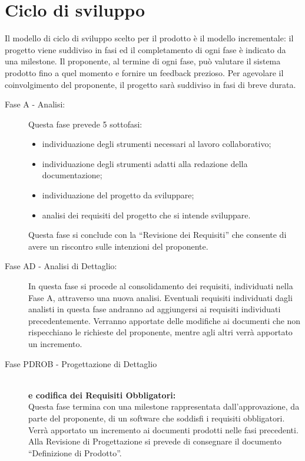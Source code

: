 \documentclass[../PianoProgetto.tex]{subfiles}
\begin{document}
\section{Ciclo di sviluppo}

	Il modello di ciclo di sviluppo scelto per il prodotto è il modello incrementale: il progetto viene suddiviso in fasi ed il completamento di ogni fase è indicato da una milestone.
	Il proponente, al termine di ogni fase, può valutare il sistema prodotto fino a quel momento e fornire un feedback prezioso.
	Per agevolare il coinvolgimento del proponente, il progetto sarà suddiviso in fasi di breve durata.
	\begin{description}
	
	\item[Fase A - Analisi:] Questa fase prevede 5 sottofasi:
		\begin{itemize}
		\item individuazione degli strumenti necessari al lavoro collaborativo;
		\item individuazione degli strumenti adatti alla redazione della documentazione;
		\item individuazione del progetto da sviluppare;
		\item analisi dei requisiti del progetto che si intende sviluppare.
		\end{itemize}
		Questa fase si conclude con la “Revisione dei Requisiti” che consente di avere un riscontro sulle intenzioni del proponente.


	\item[Fase AD - Analisi di Dettaglio:] In questa fase si procede al consolidamento dei requisiti, individuati nella Fase A, attraverso una nuova analisi.
		Eventuali requisiti individuati dagli analisti in questa fase andranno ad aggiungersi ai requisiti individuati precedentemente. 
		Verranno apportate delle modifiche ai documenti che non rispecchiano le richieste del proponente, mentre agli altri verrà apportato un incremento.


	\item[Fase PDROB - Progettazione di Dettaglio] \ \\
		\textbf{e codifica dei Requisiti Obbligatori:} \\
		Questa fase termina con una milestone rappresentata dall’approvazione, da parte del proponente, di un software che soddisfi i requisiti obbligatori.
		Verrà apportato un incremento ai documenti prodotti nelle fasi precedenti.
		Alla Revisione di Progettazione si prevede di consegnare il documento “Definizione di Prodotto”.
  

\end{description}
\end{document}
